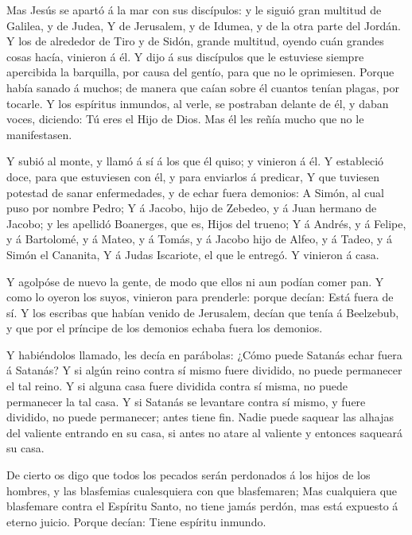  Mas Jesús se apartó á la mar con sus discípulos: y le
siguió gran multitud de Galilea, y de Judea,  Y de
Jerusalem, y de Idumea, y de la otra parte del Jordán. Y los de
alrededor de Tiro y de Sidón, grande multitud, oyendo cuán grandes cosas
hacía, vinieron á él.  Y dijo á sus discípulos que le
estuviese siempre apercibida la barquilla, por causa del gentío, para
que no le oprimiesen.  Porque había sanado á muchos; de
manera que caían sobre él cuantos tenían plagas, por tocarle.
 Y los espíritus inmundos, al verle, se postraban delante
de él, y daban voces, diciendo: Tú eres el Hijo de Dios. 
Mas él les reñía mucho que no le manifestasen.

 Y subió al monte, y llamó á sí á los que él quiso; y
vinieron á él.  Y estableció doce, para que estuviesen con
él, y para enviarlos á predicar,  Y que tuviesen potestad
de sanar enfermedades, y de echar fuera demonios:  A Simón,
al cual puso por nombre Pedro;  Y á Jacobo, hijo de
Zebedeo, y á Juan hermano de Jacobo; y les apellidó Boanerges, que es,
Hijos del trueno;  Y á Andrés, y á Felipe, y á Bartolomé, y
á Mateo, y á Tomás, y á Jacobo hijo de Alfeo, y á Tadeo, y á Simón el
Cananita,  Y á Judas Iscariote, el que le entregó. Y
vinieron á casa.

 Y agolpóse de nuevo la gente, de modo que ellos ni aun
podían comer pan.  Y como lo oyeron los suyos, vinieron
para prenderle: porque decían: Está fuera de sí.  Y los
escribas que habían venido de Jerusalem, decían que tenía á Beelzebub, y
que por el príncipe de los demonios echaba fuera los demonios.

 Y habiéndolos llamado, les decía en parábolas: ¿Cómo puede
Satanás echar fuera á Satanás?  Y si algún reino contra sí
mismo fuere dividido, no puede permanecer el tal reino.  Y
si alguna casa fuere dividida contra sí misma, no puede permanecer la
tal casa.  Y si Satanás se levantare contra sí mismo, y
fuere dividido, no puede permanecer; antes tiene fin. 
Nadie puede saquear las alhajas del valiente entrando en su casa, si
antes no atare al valiente y entonces saqueará su casa.

 De cierto os digo que todos los pecados serán perdonados á
los hijos de los hombres, y las blasfemias cualesquiera con que
blasfemaren;  Mas cualquiera que blasfemare contra el
Espíritu Santo, no tiene jamás perdón, mas está expuesto á eterno
juicio.  Porque decían: Tiene espíritu inmundo.


